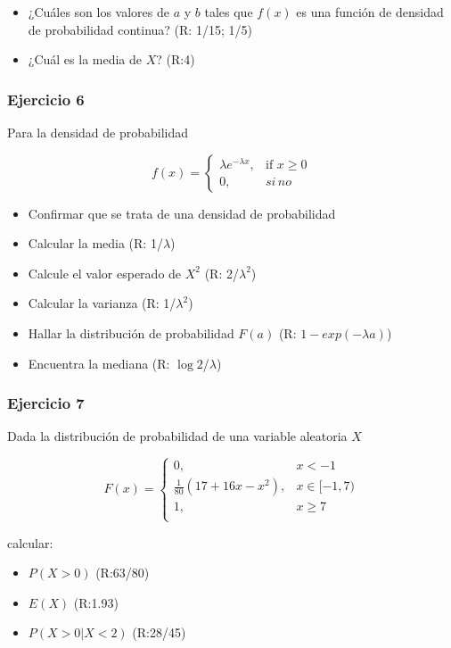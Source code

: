 \documentclass[
]{book}
\providecommand{\tightlist}{%
  \setlength{\itemsep}{0pt}\setlength{\parskip}{0pt}}
\begin{document}
\begin{itemize}
\item
  ¿Cuáles son los valores de \(a\) y \(b\) tales que \(f(x)\) es una función de densidad de probabilidad continua? (R: 1/15; 1/5)
\item
  ¿Cuál es la media de \(X\)? (R:4)
\end{itemize}

\hypertarget{ejercicio-6}{%
\subsubsection{Ejercicio 6}\label{ejercicio-6}}

Para la densidad de probabilidad

\[
    f(x)= 
\begin{cases}
    \lambda e^{-\lambda x},& \text{if } x \geq 0\\
    0,& si\,no 
\end{cases}
\]

\begin{itemize}
\tightlist
\item
  Confirmar que se trata de una densidad de probabilidad
\item
  Calcular la media (R: 1/\(\lambda\))
\item
  Calcule el valor esperado de \(X^2\) (R: 2/\(\lambda^2\))
\item
  Calcular la varianza (R: 1/\(\lambda^2\))
\item
  Hallar la distribución de probabilidad \(F(a)\) (R: \(1-exp(-\lambda a)\))
\item
  Encuentra la mediana (R: \(\log{2}\)/\(\lambda\))
\end{itemize}

\hypertarget{ejercicio-7}{%
\subsubsection{Ejercicio 7}\label{ejercicio-7}}

Dada la distribución de probabilidad de una variable aleatoria \(X\)

\[
    F(x)= 
\begin{cases}
0, & x  < -1 \\
\frac{1}{80}(17+16x-x^2),& x \in [-1,7)\\
1,& x \geq 7\\
\end{cases}
\]

calcular:

\begin{itemize}
\tightlist
\item
  \(P(X>0)\) (R:63/80)
\item
  \(E(X)\) (R:1.93)
\item
  \(P(X>0|X<2)\) (R:28/45)
\end{itemize}
\end{document}

